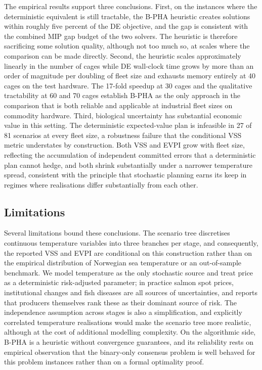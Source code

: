\documentclass[12pt,a4paper]{article}
\begin{document}
The empirical results support three conclusions. First, on the instances where the deterministic equivalent is still tractable, the B-PHA heuristic creates solutions within roughly five percent of the DE objective, and the gap is consistent with the combined MIP gap budget of the two solvers. The heuristic is therefore sacrificing some solution quality, although not too much so, at scales where the comparison can be made directly. Second, the heuristic scales approximately linearly in the number of cages while DE wall-clock time grows by more than an order of magnitude per doubling of fleet size and exhausts memory entirely at 40 cages on the test hardware. The 17-fold speedup at 30 cages and the qualitative tractability at 60 and 70 cages establish B-PHA as the only approach in the comparison that is both reliable and applicable at industrial fleet sizes on commodity hardware. Third, biological uncertainty has substantial economic value in this setting. The deterministic expected-value plan is infeasible in 27 of 81 scenarios at every fleet size, a robustness failure that the conditional VSS metric understates by construction. Both VSS and EVPI grow with fleet size, reflecting the accumulation of independent committed errors that a deterministic plan cannot hedge, and both shrink substantially under a narrower temperature spread, consistent with the principle that stochastic planning earns its keep in regimes where realisations differ substantially from each other.

\subsection{Limitations}

Several limitations bound these conclusions. The scenario tree discretises continuous temperature variables into three branches per stage, and consequently, the reported VSS and EVPI are conditional on this construction rather than on the empirical distribution of Norwegian sea temperature or an out-of-sample benchmark. We model temperature as the only stochastic source and treat price as a deterministic risk-adjusted parameter; in practice salmon spot prices, institutional changes and fish diseases are all sources of uncertainties, and \citet{bergfjord2009} reports that producers themselves rank these as their dominant source of risk. The independence assumption across stages is also a simplification, and explicitly correlated temperature realisations would make the scenario tree more realistic, although at the cost of additional modelling complexity. On the algorithmic side, B-PHA is a heuristic without convergence guarantees, and its reliability rests on empirical observation that the binary-only consensus problem is well behaved for this problem
instances rather than on a formal optimality proof.
\end{document}
